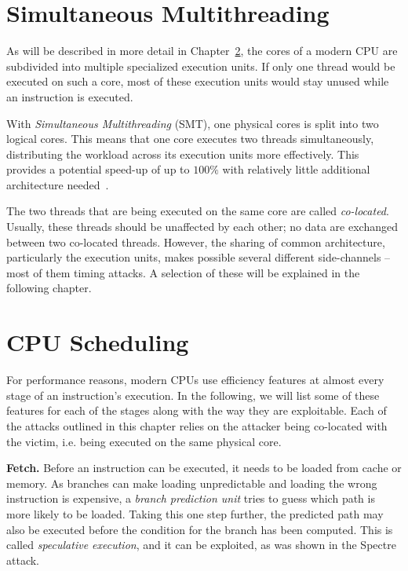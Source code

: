\documentclass[11pt,
  titlepage=false,
]{scrreprt}
\begin{document}
\section{Simultaneous Multithreading}
\label{sec:smt}

As will be described in more detail in Chapter~\ref{sec:cpuschedulers},
the cores of a modern CPU are subdivided into multiple specialized execution units.
If only one thread would be executed on such a core,
most of these execution units would stay unused while an instruction is executed.

With \textit{Simultaneous Multithreading} (SMT), one physical cores is split into two logical cores.
This means that one core executes two threads simultaneously, distributing the workload across its execution units more effectively.
This provides a potential speed-up of up to $100\%$ with relatively little additional architecture needed~\cite{tullsen1995simultaneous}.

The two threads that are being executed on the same core are called \textit{co-located}.
Usually, these threads should be unaffected by each other; no data are exchanged between two co-located threads.
However, the sharing of common architecture, particularly the execution units,
makes possible several different side-channels -- most of them timing attacks.
A selection of these will be explained in the following chapter.

\section{CPU Scheduling}
\label{sec:cpuschedulers}
For performance reasons, modern CPUs use efficiency features at almost every stage of an instruction's execution.
In the following, we will list some of these features for each of the stages along with the way they are exploitable.
Each of the attacks outlined in this chapter relies on the attacker being co-located with the victim,
i.e. being executed on the same physical core.

\textbf{Fetch.}
Before an instruction can be executed, it needs to be loaded from cache or memory.
As branches can make loading unpredictable and loading the wrong instruction is expensive, a \textit{branch prediction unit} tries to guess which path is more likely to be loaded.
Taking this one step further, the predicted path may also be executed before the condition for the branch has been computed.
This is called \textit{speculative execution}\cite{AMD2020OptimizationEPYC7002}, and it can be exploited, as was shown in the Spectre~\cite{spKocherHFGGHHLM019} attack.
\end{document}
